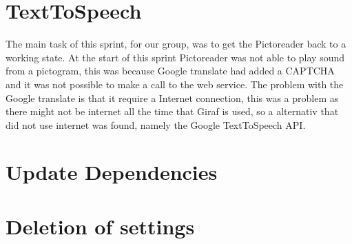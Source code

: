 \section{TextToSpeech}
The main task of this sprint, for our group, was to get the Pictoreader back to a working state. At the start of this sprint Pictoreader was not able to play sound from a pictogram, this was because Google translate had added a CAPTCHA and it was not possible to make a call to the web service. The problem with the Google translate is that it require a Internet connection, this was a problem as there might not be internet all the time that Giraf is used, so a alternativ that did not use internet was found, namely the Google TextToSpeech API.


\section{Update Dependencies}

\section{Deletion of settings}

